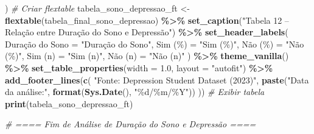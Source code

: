 \documentclass[
]{article}
\newenvironment{Shaded}{\begin{snugshade}}{\end{snugshade}}
\newcommand{\AttributeTok}[1]{\textcolor[rgb]{0.13,0.29,0.53}{#1}}
\newcommand{\CommentTok}[1]{\textcolor[rgb]{0.56,0.35,0.01}{\textit{#1}}}
\newcommand{\FloatTok}[1]{\textcolor[rgb]{0.00,0.00,0.81}{#1}}
\newcommand{\FunctionTok}[1]{\textcolor[rgb]{0.13,0.29,0.53}{\textbf{#1}}}
\newcommand{\NormalTok}[1]{#1}
\newcommand{\OtherTok}[1]{\textcolor[rgb]{0.56,0.35,0.01}{#1}}
\newcommand{\SpecialCharTok}[1]{\textcolor[rgb]{0.81,0.36,0.00}{\textbf{#1}}}
\newcommand{\StringTok}[1]{\textcolor[rgb]{0.31,0.60,0.02}{#1}}
\begin{document}
\begin{Shaded}
\begin{Highlighting}[]
\NormalTok{  )}
\CommentTok{\# Criar flextable}
\NormalTok{tabela\_sono\_depressao\_ft }\OtherTok{\textless{}{-}} \FunctionTok{flextable}\NormalTok{(tabela\_final\_sono\_depressao) }\SpecialCharTok{\%\textgreater{}\%}
  \FunctionTok{set\_caption}\NormalTok{(}\StringTok{"Tabela 12 – Relação entre Duração do Sono e Depressão"}\NormalTok{) }\SpecialCharTok{\%\textgreater{}\%}
  \FunctionTok{set\_header\_labels}\NormalTok{(}
    \StringTok{\textasciigrave{}}\AttributeTok{Duração do Sono}\StringTok{\textasciigrave{}} \OtherTok{=} \StringTok{"Duração do Sono"}\NormalTok{,}
    \StringTok{\textasciigrave{}}\AttributeTok{Sim (\%)}\StringTok{\textasciigrave{}} \OtherTok{=} \StringTok{"Sim (\%)"}\NormalTok{,}
    \StringTok{\textasciigrave{}}\AttributeTok{Não (\%)}\StringTok{\textasciigrave{}} \OtherTok{=} \StringTok{"Não (\%)"}\NormalTok{,}
    \StringTok{\textasciigrave{}}\AttributeTok{Sim (n)}\StringTok{\textasciigrave{}} \OtherTok{=} \StringTok{"Sim (n)"}\NormalTok{,}
    \StringTok{\textasciigrave{}}\AttributeTok{Não (n)}\StringTok{\textasciigrave{}} \OtherTok{=} \StringTok{"Não (n)"}
\NormalTok{  ) }\SpecialCharTok{\%\textgreater{}\%}
  \FunctionTok{theme\_vanilla}\NormalTok{() }\SpecialCharTok{\%\textgreater{}\%}
  \FunctionTok{set\_table\_properties}\NormalTok{(}\AttributeTok{width =} \FloatTok{1.0}\NormalTok{, }\AttributeTok{layout =} \StringTok{"autofit"}\NormalTok{) }\SpecialCharTok{\%\textgreater{}\%}
  \FunctionTok{add\_footer\_lines}\NormalTok{(}\FunctionTok{c}\NormalTok{(}
    \StringTok{"Fonte: Depression Student Dataset (2023)"}\NormalTok{,}
    \FunctionTok{paste}\NormalTok{(}\StringTok{"Data da análise:"}\NormalTok{, }\FunctionTok{format}\NormalTok{(}\FunctionTok{Sys.Date}\NormalTok{(), }\StringTok{"\%d/\%m/\%Y"}\NormalTok{))}
\NormalTok{  ))}
\CommentTok{\# Exibir tabela}
\FunctionTok{print}\NormalTok{(tabela\_sono\_depressao\_ft)}



\CommentTok{\# ==== Fim de Análise de Duração do Sono e Depressão ====}


\end{Highlighting}
\end{Shaded}
\end{document}
